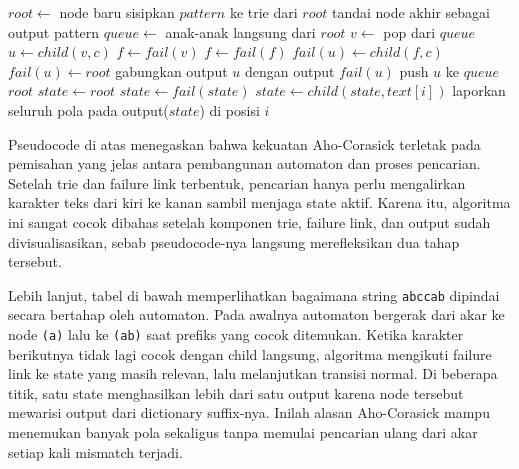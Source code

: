 \begin{tcolorbox}[breakable,title={Algoritma Aho-Corasick}]
    \begin{algorithmic}[1]
        \State $root \gets$ node baru
        \State sisipkan $pattern$ ke trie dari $root$
        \State tandai node akhir sebagai output pattern
        \EndFor
        \State $queue \gets$ anak-anak langsung dari $root$
        \State $v \gets$ pop dari $queue$
        \State $u \gets child(v, c)$
        \State $f \gets fail(v)$
        \State $f \gets fail(f)$
        \EndWhile
        \State $fail(u) \gets child(f, c)$
        \Else
        \State $fail(u) \gets root$
        \EndIf
        \State gabungkan output $u$ dengan output $fail(u)$
        \State push $u$ ke $queue$
        \EndFor
        \EndWhile
        \State \Return $root$
        \EndProcedure
        \Statex
        \State $state \gets root$
        \State $state \gets fail(state)$
        \EndWhile
        \State $state \gets child(state, text[i])$
        \EndIf
        \State laporkan seluruh pola pada output($state$) di posisi $i$
        \EndIf
        \EndFor
        \EndProcedure
    \end{algorithmic}
\end{tcolorbox}

Pseudocode di atas menegaskan bahwa kekuatan Aho-Corasick terletak pada pemisahan yang jelas antara pembangunan automaton dan proses pencarian. Setelah trie dan failure link terbentuk, pencarian hanya perlu mengalirkan karakter teks dari kiri ke kanan sambil menjaga state aktif. Karena itu, algoritma ini sangat cocok dibahas setelah komponen trie, failure link, dan output sudah divisualisasikan, sebab pseudocode-nya langsung merefleksikan dua tahap tersebut.

Lebih lanjut, tabel di bawah memperlihatkan bagaimana string \texttt{abccab} dipindai secara bertahap oleh automaton. Pada awalnya automaton bergerak dari akar ke node \texttt{(a)} lalu ke \texttt{(ab)} saat prefiks yang cocok ditemukan. Ketika karakter berikutnya tidak lagi cocok dengan child langsung, algoritma mengikuti failure link ke state yang masih relevan, lalu melanjutkan transisi normal. Di beberapa titik, satu state menghasilkan lebih dari satu output karena node tersebut mewarisi output dari dictionary suffix-nya. Inilah alasan Aho-Corasick mampu menemukan banyak pola sekaligus tanpa memulai pencarian ulang dari akar setiap kali mismatch terjadi.

